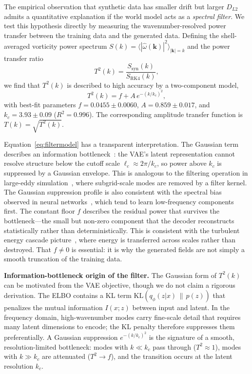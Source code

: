 \documentclass[reprint,aps,pre]{revtex4-2}
\begin{document}
The empirical observation that synthetic data has smaller drift but larger $D_{L2}$ admits a quantitative explanation if the world model acts as a \textit{spectral filter}. We test this hypothesis directly by measuring the wavenumber-resolved power transfer between the training data and the generated data. Defining the shell-averaged vorticity power spectrum $S(k) = \langle |\hat\omega(\mathbf{k})|^2 \rangle_{|\mathbf{k}|=k}$ and the power transfer ratio
\begin{equation}
T^2(k) = \frac{S_{\text{syn}}(k)}{S_{\text{RK4}}(k)},
\label{eq:transfer}
\end{equation}
we find that $T^2(k)$ is described to high accuracy by a two-component model,
\begin{equation}
T^2(k) = f + A\,e^{-(k/k_c)^2},
\label{eq:filtermodel}
\end{equation}
with best-fit parameters $f = 0.0455 \pm 0.0060$, $A = 0.859 \pm 0.017$, and $k_c = 3.93 \pm 0.09$ ($R^2 = 0.996$). The corresponding amplitude transfer function is $T(k) = \sqrt{T^2(k)}$.

Equation~\eqref{eq:filtermodel} has a transparent interpretation. The Gaussian term describes an information bottleneck~\cite{kingma2014autoencoding,tishby2015deep}: the VAE's latent representation cannot resolve structure below the cutoff scale $\ell_c \approx 2\pi/k_c$, so power above $k_c$ is suppressed by a Gaussian envelope. This is analogous to the filtering operation in large-eddy simulation~\cite{leonard1975energy,germano1986dynamic,meneveau2000scale}, where subgrid-scale modes are removed by a filter kernel. The Gaussian suppression profile is also consistent with the spectral bias observed in neural networks~\cite{rahaman2019spectral,xu2019frequency}, which tend to learn low-frequency components first. The constant floor $f$ describes the residual power that survives the bottleneck---the small but non-zero component that the decoder reconstructs statistically rather than deterministically. This is consistent with the turbulent energy cascade picture~\cite{frisch1995turbulence}, where energy is transferred across scales rather than destroyed. That $f \neq 0$ is essential: it is why the generated fields are not simply a smooth truncation of the training data.

\textbf{Information-bottleneck origin of the filter.} The Gaussian form of $T^2(k)$ can be motivated from the VAE objective, though we do not claim a rigorous derivation. The ELBO contains a KL term $\mathrm{KL}(q_\phi(z|x)\,\|\,p(z))$ that penalizes the mutual information $I(x;z)$ between input and latent. In the frequency domain, high-wavenumber modes carry fine-scale detail that requires many latent dimensions to encode; the KL penalty therefore suppresses them preferentially. A Gaussian suppression $e^{-(k/k_c)^2}$ is the signature of a smooth, resolution-limited bottleneck: modes with $k \ll k_c$ pass through ($T^2 \approx 1$), modes with $k \gg k_c$ are attenuated ($T^2 \to f$), and the transition occurs at the latent resolution $k_c$.
\end{document}
